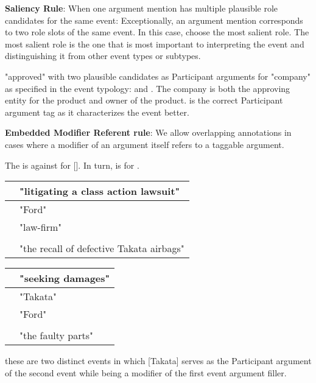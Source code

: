 \noindent\textbf{Saliency Rule}:
When one argument mention has multiple plausible role candidates for the same event:
Exceptionally, an argument mention corresponds to two role slots of the same event.
In this case, choose the most salient role.
The most salient role is the one that is most important to interpreting the event and distinguishing it from other event types or subtypes.

\begin{exe}
    \ex {}
        \expl "approved"  with two plausible candidates as Participant arguments for "company" as specified in the event typology:  and . The company is both the approving entity for the product and owner of the product.
        \expl {} is the correct Participant argument tag as it characterizes the event better.
\end{exe}

\noindent\textbf{Embedded Modifier Referent rule}:
We allow overlapping annotations in cases where a modifier of an argument itself refers to a taggable argument.

\begin{exe}
    \ex The  is  against  for []. In turn,  is  for .
    \expl \begin{tabular}{|L{6cm}|L{7cm}|} \hline
         & "litigating a class action lawsuit" \\\hline
         & "Ford" \\
         & "law-firm" \\
         &  \\
         & "the recall of defective Takata airbags" \\
        \hline \end{tabular}
    \expl \begin{tabular}{|L{6cm}|L{7cm}|} \hline
         & "seeking damages" \\\hline
         & "Takata" \\
         & "Ford" \\
         &  \\
         & "the faulty parts" \\
        \hline \end{tabular}
    \expl these are two distinct events in which [Takata] serves as the  Participant argument of the second event while being a modifier of the first event argument filler. 
\end{exe}

